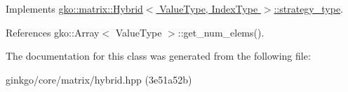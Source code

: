 Implements \hyperlink{classgko_1_1matrix_1_1Hybrid_1_1strategy__type_a0a0cd4024f27c7d0f286f35fc0a6de60}{gko\+::matrix\+::\+Hybrid$<$ Value\+Type, Index\+Type $>$\+::strategy\+\_\+type}.



References gko\+::\+Array$<$ Value\+Type $>$\+::get\+\_\+num\+\_\+elems().



The documentation for this class was generated from the following file\+:\begin{DoxyCompactItemize}
\item 
ginkgo/core/matrix/hybrid.\+hpp (3e51a52b)\end{DoxyCompactItemize}
